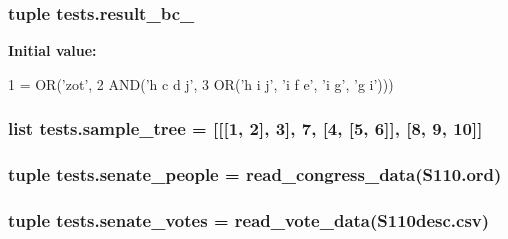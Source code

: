 \subsubsection[{result\+\_\+bc\+\_\+5}]{\setlength{\rightskip}{0pt plus 5cm}tuple tests.\+result\+\_\+bc\+\_}\label{namespacetests_a3c4894e10dff7d903a438b725ab36dc5}
{\bfseries Initial value\+:}
\begin{DoxyCode}
1 = OR(\textcolor{stringliteral}{'zot'},
2                  AND(\textcolor{stringliteral}{'h c d j'},
3                      OR(\textcolor{stringliteral}{'h i j'}, \textcolor{stringliteral}{'i f e'}, \textcolor{stringliteral}{'i g'}, \textcolor{stringliteral}{'g i'})))
\end{DoxyCode}
\hypertarget{namespacetests_aed50057d4b41d5c384706e2092ba8639}{}
\subsubsection[{sample\+\_\+tree}]{\setlength{\rightskip}{0pt plus 5cm}list tests.\+sample\+\_\+tree = \mbox{[}\mbox{[}\mbox{[}1, 2\mbox{]}, 3\mbox{]}, 7, \mbox{[}4, \mbox{[}5, 6\mbox{]}\mbox{]}, \mbox{[}8, 9, 10\mbox{]}\mbox{]}}\label{namespacetests_aed50057d4b41d5c384706e2092ba8639}
\hypertarget{namespacetests_a76731f212803054faab680e5139f44e4}{}
\subsubsection[{senate\+\_\+people}]{\setlength{\rightskip}{0pt plus 5cm}tuple tests.\+senate\+\_\+people = read\+\_\+congress\+\_\+data(\textquotesingle{}S110.\+ord\textquotesingle{})}\label{namespacetests_a76731f212803054faab680e5139f44e4}
\hypertarget{namespacetests_a31fa9b044d03a027e3ab901df1eae4f3}{}
\subsubsection[{senate\+\_\+votes}]{\setlength{\rightskip}{0pt plus 5cm}tuple tests.\+senate\+\_\+votes = read\+\_\+vote\+\_\+data(\textquotesingle{}S110desc.\+csv\textquotesingle{})}\label{namespacetests_a31fa9b044d03a027e3ab901df1eae4f3}
\hypertarget{namespacetests_a710ce4daf7bb272f672cf82c3a6ca91d}{}
